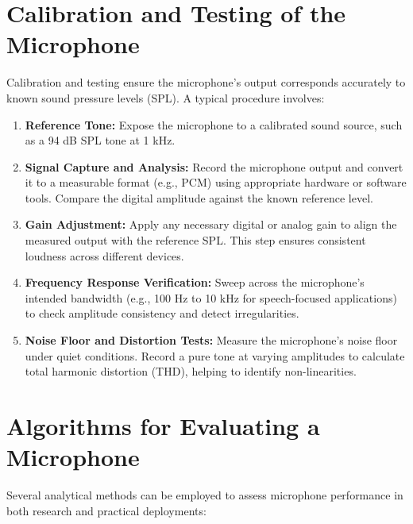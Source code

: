\section{Calibration and Testing of the Microphone}

\bigskip
Calibration and testing ensure the microphone’s output corresponds accurately to known sound pressure levels (SPL). A typical procedure involves:

\begin{enumerate}
	\item \textbf{Reference Tone:} Expose the microphone to a calibrated sound source, such as a 94 dB SPL tone at 1 kHz.
	
	\item \textbf{Signal Capture and Analysis:} Record the microphone output and convert it to a measurable format (e.g., PCM) using appropriate hardware or software tools. Compare the digital amplitude against the known reference level.
	
	\item \textbf{Gain Adjustment:} Apply any necessary digital or analog gain to align the measured output with the reference SPL. This step ensures consistent loudness across different devices.
	
	\item \textbf{Frequency Response Verification:} Sweep across the microphone’s intended bandwidth (e.g., 100 Hz to 10 kHz for speech-focused applications) to check amplitude consistency and detect irregularities.
	
	\item \textbf{Noise Floor and Distortion Tests:} Measure the microphone’s noise floor under quiet conditions. Record a pure tone at varying amplitudes to calculate total harmonic distortion (THD), helping to identify non-linearities.
\end{enumerate}

\section{Algorithms for Evaluating a Microphone}

\bigskip
Several analytical methods can be employed to assess microphone performance in both research and practical deployments:

